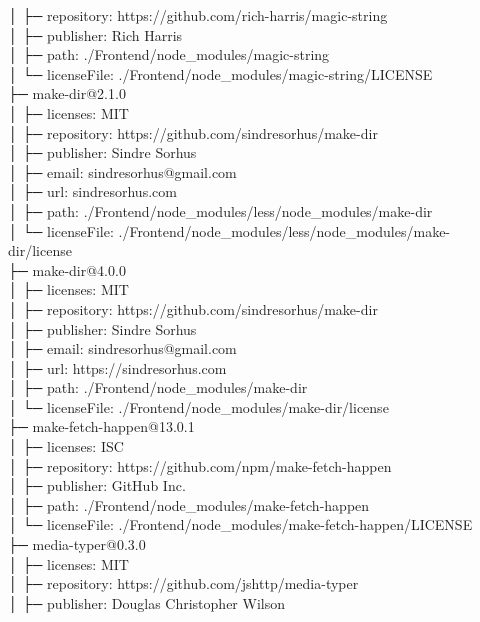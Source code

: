 \documentclass[
    paper=a4,
    twoside=false,
    parskip=half,
    listof=entryprefix,
    listof=totoc,
    index=totoc,
    bibliography=totoc,
    headsepline,
]{scrbook}
\begin{document}
    │  ├─ repository: https://github.com/rich-harris/magic-string\\
    │  ├─ publisher: Rich Harris\\
    │  ├─ path: ./Frontend/node\_modules/magic-string\\
    │  └─ licenseFile: ./Frontend/node\_modules/magic-string/LICENSE\\
    ├─ make-dir@2.1.0\\
    │  ├─ licenses: MIT\\
    │  ├─ repository: https://github.com/sindresorhus/make-dir\\
    │  ├─ publisher: Sindre Sorhus\\
    │  ├─ email: sindresorhus@gmail.com\\
    │  ├─ url: sindresorhus.com\\
    │  ├─ path: ./Frontend/node\_modules/less/node\_modules/make-dir\\
    │  └─ licenseFile: ./Frontend/node\_modules/less/node\_modules/make-dir/license\\
    ├─ make-dir@4.0.0\\
    │  ├─ licenses: MIT\\
    │  ├─ repository: https://github.com/sindresorhus/make-dir\\
    │  ├─ publisher: Sindre Sorhus\\
    │  ├─ email: sindresorhus@gmail.com\\
    │  ├─ url: https://sindresorhus.com\\
    │  ├─ path: ./Frontend/node\_modules/make-dir\\
    │  └─ licenseFile: ./Frontend/node\_modules/make-dir/license\\
    ├─ make-fetch-happen@13.0.1\\
    │  ├─ licenses: ISC\\
    │  ├─ repository: https://github.com/npm/make-fetch-happen\\
    │  ├─ publisher: GitHub Inc.\\
    │  ├─ path: ./Frontend/node\_modules/make-fetch-happen\\
    │  └─ licenseFile: ./Frontend/node\_modules/make-fetch-happen/LICENSE\\
    ├─ media-typer@0.3.0\\
    │  ├─ licenses: MIT\\
    │  ├─ repository: https://github.com/jshttp/media-typer\\
    │  ├─ publisher: Douglas Christopher Wilson\\
\end{document}

